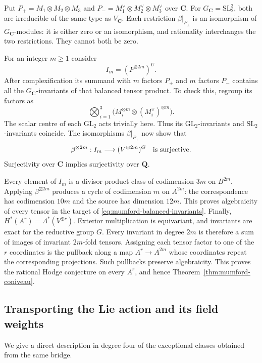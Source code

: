 Put $P_+=M_1\otimes M_2\otimes M_3$ and
$P_-=M_1^\vee\otimes M_2^\vee\otimes M_3^\vee$ over $\mathbf C$.
For $G_{\mathbf C}=\mathrm{SL}_2^3$, both are irreducible of the
same type as $V_{\mathbf C}$.  Each restriction $\beta|_{P_\pm}$
is an isomorphism of $G_{\mathbf C}$-modules: it is either zero or
an isomorphism, and rationality interchanges the two restrictions.
They cannot both be zero.

For an integer $m\geq1$ consider
\[
 I_m=(P^{\otimes 2m})^U.
\]
After complexification its summand with $m$ factors $P_+$ and $m$
factors $P_-$ contains all the $G_{\mathbf C}$-invariants of that
balanced tensor product.  To check this, regroup its factors as
\[
 \bigotimes_{i=1}^3
       \bigl(M_i^{\otimes m}\otimes(M_i^\vee)^{\otimes m}\bigr).
\]
The scalar centre of each $\mathrm{GL}_2$ acts trivially here.
Thus its $\mathrm{GL}_2$-invariants and
$\mathrm{SL}_2$-invariants coincide.
The isomorphisms $\beta|_{P_\pm}$ now show that
\begin{equation}
 \beta^{\otimes2m}:I_m\longrightarrow(V^{\otimes2m})^G
       \quad\hbox{is surjective}.
 \label{eq:mumford-balanced-invariants}
\end{equation}
Surjectivity over $\mathbf C$ implies surjectivity over $\mathbf Q$.

Every element of $I_m$ is a divisor-product class of codimension $3m$
on $B^{2m}$.  Applying $\beta^{\boxtimes2m}$ produces a cycle of
codimension $m$ on $A^{2m}$: the correspondence has codimension $10m$
and the source has dimension $12m$.  This proves algebraicity of
every tensor in the target of \eqref{eq:mumford-balanced-invariants}.
Finally, $H^*(A^r)=\Lambda^*(V^{\oplus r})$.  Exterior multiplication
is equivariant, and invariants are exact for the reductive group $G$.
Every invariant in degree $2m$ is therefore a sum of images of
invariant $2m$-fold tensors.  Assigning each tensor factor to one of
the $r$ coordinates is the pullback along a map
$A^r\to A^{2m}$ whose coordinates repeat the corresponding
projections.  Such pullbacks preserve algebraicity.
This proves the rational Hodge conjecture on every $A^r$, and hence
Theorem~\ref{thm:mumford-coniveau}.

\subsection{Transporting the Lie action and its field weights}

We give a direct description in degree four of the exceptional classes
obtained from the same bridge.

